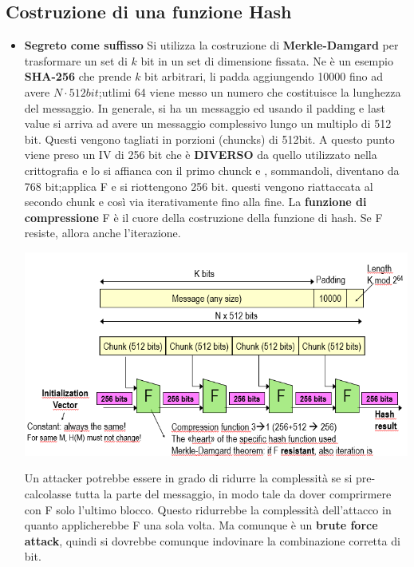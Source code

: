 \documentclass{book}
\theoremstyle{remark}
\begin{document}
\subsection{Costruzione di una funzione Hash}
\begin{itemize}
	\item \textbf{Segreto come suffisso} Si utilizza la costruzione di \textbf{Merkle-Damgard} per trasformare un set di \(k\) bit in un set di dimensione fissata\@. Ne è un esempio \textbf{SHA-256} che prende \(k\) bit arbitrari, li padda aggiungendo 10000 fino ad avere \(N\cdot512bit\);\@negli utlimi 64 viene messo un numero che costituisce la lunghezza del messaggio\@.\newline
	      In generale, si ha un messaggio ed usando il padding e last value si arriva ad avere un messaggio complessivo lungo un multiplo di 512 bit\@. Questi vengono tagliati in porzioni (chuncks) di 512bit\@. A questo punto viene preso un IV di 256 bit che è \textbf{DIVERSO} da quello utilizzato nella crittografia e lo si affianca con il primo chunck e , sommandoli, diventano da 768 bit;\@si applica F e si riottengono 256 bit\@. questi vengono riattaccata al secondo chunk e così via iterativamente fino alla fine\@. La \textbf{funzione di compressione} F è il cuore della costruzione della funzione di hash\@. Se F resiste, allora anche l'iterazione\@.
	      \begin{center}
		      \includegraphics[scale=0.3]{hashConstruction.png}
	      \end{center}
	      Un attacker potrebbe essere in grado di ridurre la complessità se si pre-calcolasse tutta la parte del messaggio, in modo tale da dover comprirmere con F solo l'ultimo blocco\@. Questo ridurrebbe la complessità dell'attacco in quanto applicherebbe F una sola volta\@. Ma comunque è un \textbf{brute force attack}, quindi si dovrebbe comunque indovinare la combinazione corretta di bit\@.

\end{itemize}
\end{document}
